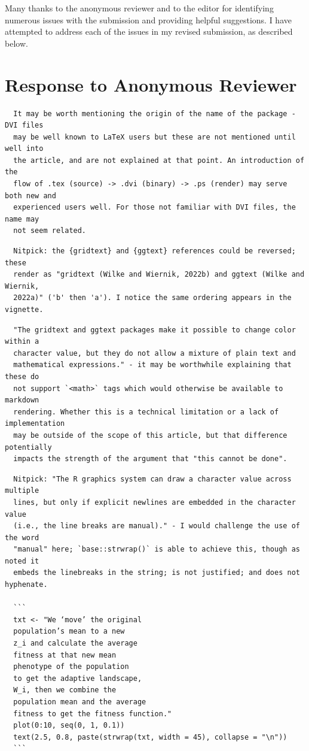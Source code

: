 \documentclass{article}
\begin{document}
Many thanks to the anonymous reviewer and to the editor for identifying numerous
issues with the submission and providing helpful suggestions.  I have attempted
to address each of the issues in my revised submission, as described below.

\section*{Response to Anonymous Reviewer}

\begin{verbatim}
  It may be worth mentioning the origin of the name of the package - DVI files
  may be well known to LaTeX users but these are not mentioned until well into 
  the article, and are not explained at that point. An introduction of the 
  flow of .tex (source) -> .dvi (binary) -> .ps (render) may serve both new and
  experienced users well. For those not familiar with DVI files, the name may
  not seem related.
\end{verbatim}

\begin{verbatim}
  Nitpick: the {gridtext} and {ggtext} references could be reversed; these 
  render as "gridtext (Wilke and Wiernik, 2022b) and ggtext (Wilke and Wiernik, 
  2022a)" ('b' then 'a'). I notice the same ordering appears in the vignette.
\end{verbatim}

\begin{verbatim}
  "The gridtext and ggtext packages make it possible to change color within a
  character value, but they do not allow a mixture of plain text and 
  mathematical expressions." - it may be worthwhile explaining that these do 
  not support `<math>` tags which would otherwise be available to markdown 
  rendering. Whether this is a technical limitation or a lack of implementation 
  may be outside of the scope of this article, but that difference potentially 
  impacts the strength of the argument that "this cannot be done".
\end{verbatim}

\begin{verbatim}
  Nitpick: "The R graphics system can draw a character value across multiple
  lines, but only if explicit newlines are embedded in the character value
  (i.e., the line breaks are manual)." - I would challenge the use of the word
  "manual" here; `base::strwrap()` is able to achieve this, though as noted it
  embeds the linebreaks in the string; is not justified; and does not hyphenate.

  ```
  txt <- "We ‘move’ the original
  population’s mean to a new
  z_i and calculate the average
  fitness at that new mean
  phenotype of the population
  to get the adaptive landscape,
  W_i, then we combine the
  population mean and the average
  fitness to get the fitness function."
  plot(0:10, seq(0, 1, 0.1))
  text(2.5, 0.8, paste(strwrap(txt, width = 45), collapse = "\n"))
  ```
\end{verbatim}
\end{document}
